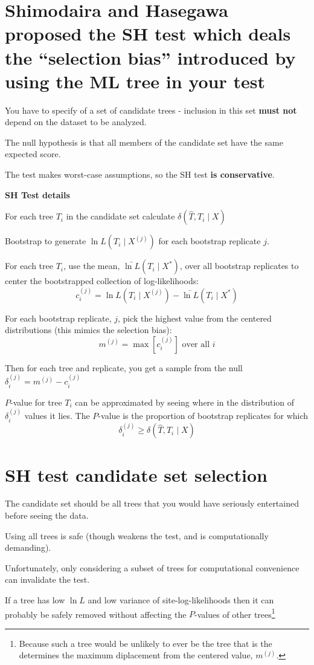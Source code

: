 \documentclass[landscape]{foils}
\begin{document}
\myNewSlide 
\section*{Shimodaira and Hasegawa proposed the SH test which deals the ``selection bias'' introduced by using the ML tree in your test}
You have to specify of a set of candidate trees - inclusion in this set {\bf must not} depend on the dataset to be analyzed.

The null hypothesis is that all members of the candidate set have the same expected score.

The test makes worst-case assumptions, so the SH test {\bf is conservative}.

\myNewSlide
{\bf SH Test details}
\normalsize
\begin{compactitem}
	\item For each tree $T_i$ in the candidate set calculate $\delta(\hat{T}, T_i \mid X)$
	\item Bootstrap to generate ${\ln L}(T_i \mid X^{(j)})$ for each bootstrap replicate $j$.
	\item For each tree $T_i$, use the mean, $\bar{\ln L}(T_i \mid X^{\ast})$, over all bootstrap replicates to center the bootstrapped collection of log-likelihoods:
		$$c_i^{(j)} = {\ln L}(T_i \mid X^{(j)})-\bar{\ln L}(T_i \mid X^{\ast})$$
	\item For each bootstrap replicate, $j$, pick the highest value from the centered distributions (this mimics the selection bias): $$m^{(j)} = \max\left[c_i^{(j)}\right] \mbox{ over all } i$$
	\item Then for each tree and replicate, you get a sample from the null $\delta_i^{(j)} = m^{(j)} - c_i^{(j)}$
	\item $P$-value for tree $T_i$ can be approximated by seeing where in the distribution of $\delta_i^{(j)}$ values it lies. The $P$-value is the proportion of bootstrap replicates for which $$\delta_i^{(j)} \geq \delta(\hat{T}, T_i \mid X)$$
\end{compactitem}

\myNewSlide
\section*{SH test candidate set selection}
\large
\begin{compactitem}
	\item The candidate set should be all trees that you would have seriously entertained before seeing the data. 
	\item Using all trees is safe (though weakens the test, and is computationally demanding).
	\item Unfortunately, only considering a subset of trees for computational convenience can invalidate the test.
	\item If a tree has low $\ln L$ and low variance of site-log-likelihoods then it can probably be safely removed without affecting the $P$-values of other trees\footnote{Because such a tree would be unlikely to ever be the tree that is the determines the maximum diplacement from the centered value, $m^{(j)}$.}
\end{compactitem}
\end{document}
